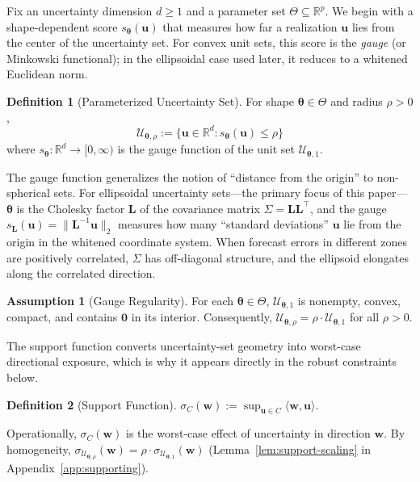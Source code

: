 \documentclass[11pt]{article}
\newcommand{\R}{\mathbb{R}}
\newcommand{\cU}{\mathcal{U}}
\newcommand{\ip}[2]{\langle #1, #2 \rangle}
\newcommand{\btheta}{\bm{\theta}}
\newcommand{\bu}{\bm{u}}
\newcommand{\bw}{\bm{w}}
\newcommand{\bL}{\bm{L}}
\theoremstyle{definition}
\newtheorem{definition}{Definition}
\newtheorem{assumption}{Assumption}
\begin{document}
Fix an uncertainty dimension $d \geq 1$ and a parameter set $\Theta \subseteq \R^p$. We begin with a shape-dependent score $s_{\btheta}(\bu)$ that measures how far a realization $\bu$ lies from the center of the uncertainty set. For convex unit sets, this score is the \emph{gauge} (or Minkowski functional); in the ellipsoidal case used later, it reduces to a whitened Euclidean norm.

\begin{definition}[Parameterized Uncertainty Set]
For shape $\btheta \in \Theta$ and radius $\rho > 0$,
\begin{equation}\label{eq:uset}
\cU_{\btheta,\rho} := \{\bu \in \R^d : s_{\btheta}(\bu) \leq \rho\}
\end{equation}
where $s_{\btheta}: \R^d \to [0,\infty)$ is the gauge function of the unit set $\cU_{\btheta,1}$.
\end{definition}

The gauge function generalizes the notion of ``distance from the origin'' to non-spherical sets. For ellipsoidal uncertainty sets---the primary focus of this paper---$\btheta$ is the Cholesky factor $\bL$ of the covariance matrix $\Sigma = \bL\bL^\top$, and the gauge $s_{\bL}(\bu) = \|\bL^{-1}\bu\|_2$ measures how many ``standard deviations'' $\bu$ lie from the origin in the whitened coordinate system. When forecast errors in different zones are positively correlated, $\Sigma$ has off-diagonal structure, and the ellipsoid elongates along the correlated direction.

\begin{assumption}[Gauge Regularity]\label{asm:gauge}
For each $\btheta \in \Theta$, $\cU_{\btheta,1}$ is nonempty, convex, compact, and contains $\bm{0}$ in its interior. Consequently, $\cU_{\btheta,\rho} = \rho \cdot \cU_{\btheta,1}$ for all $\rho > 0$.
\end{assumption}

The support function converts uncertainty-set geometry into worst-case directional exposure, which is why it appears directly in the robust constraints below.

\begin{definition}[Support Function]
$\sigma_C(\bw) := \sup_{\bu \in C} \ip{\bw}{\bu}$.
\end{definition}

Operationally, $\sigma_C(\bw)$ is the worst-case effect of uncertainty in direction $\bw$. By homogeneity, $\sigma_{\cU_{\btheta,\rho}}(\bw) = \rho \cdot \sigma_{\cU_{\btheta,1}}(\bw)$ (Lemma~\ref{lem:support-scaling} in Appendix~\ref{app:supporting}).
\end{document}

